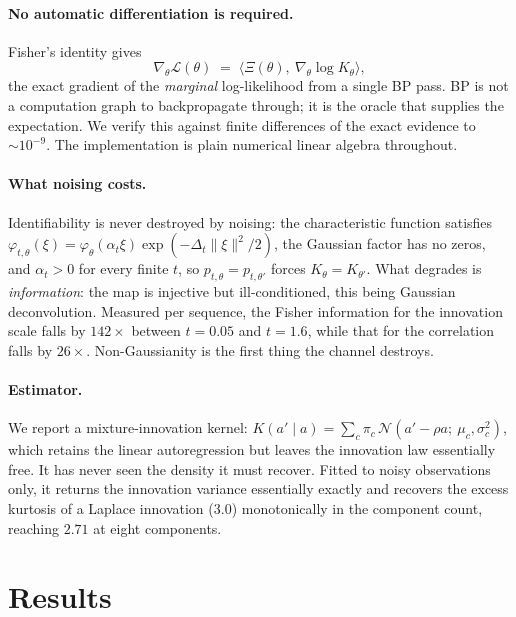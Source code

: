 \documentclass{article}
\begin{document}
\paragraph{No automatic differentiation is required.} Fisher's identity gives
\begin{equation}
\nabla_\theta \mathcal{L}(\theta) \;=\; \big\langle \Xi(\theta),\ \nabla_\theta \log K_\theta
\big\rangle,
\end{equation}
the exact gradient of the \emph{marginal} log-likelihood from a single BP pass. BP is not a
computation graph to backpropagate through; it is the oracle that supplies the expectation.
We verify this against finite differences of the exact evidence to $\sim\!10^{-9}$. The
implementation is plain numerical linear algebra throughout.

\paragraph{What noising costs.} Identifiability is never destroyed by noising: the
characteristic function satisfies $\varphi_{t,\theta}(\xi) = \varphi_\theta(\alpha_t
\xi)\exp(-\Delta_t\|\xi\|^2/2)$, the Gaussian factor has no zeros, and $\alpha_t > 0$ for
every finite $t$, so $p_{t,\theta} = p_{t,\theta'}$ forces $K_\theta = K_{\theta'}$. What
degrades is \emph{information}: the map is injective but ill-conditioned, this being Gaussian
deconvolution. Measured per sequence, the Fisher information for the innovation scale falls
by $142\times$ between $t=0.05$ and $t=1.6$, while that for the correlation falls by
$26\times$. Non-Gaussianity is the first thing the channel destroys.

\paragraph{Estimator.} We report a mixture-innovation kernel: $K(a'\mid a) = \sum_{c}
\pi_c\,\mathcal{N}(a' - \rho a;\ \mu_c, \sigma_c^2)$, which retains the linear
autoregression but leaves the innovation law essentially free. It has never seen the density
it must recover. Fitted to noisy observations only, it returns the innovation variance
essentially exactly and recovers the excess kurtosis of a Laplace innovation ($3.0$)
monotonically in the component count, reaching $2.71$ at eight components.

\section{Results}
\label{sec:results}
\end{document}
